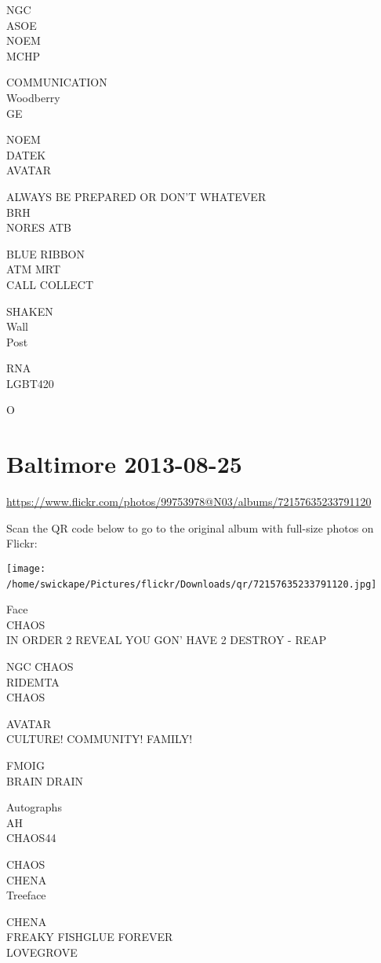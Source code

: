 \documentclass[10pt,letterpaper]{article}
\begin{document}
NGC\\
ASOE\\
NOEM\\
MCHP

COMMUNICATION\\
Woodberry\\
GE

NOEM\\
DATEK\\
AVATAR

ALWAYS BE PREPARED OR DON'T WHATEVER\\
BRH\\
NORES ATB

BLUE RIBBON\\
ATM MRT\\
CALL COLLECT

SHAKEN\\
Wall\\
Post

RNA\\
LGBT420

O
\

\section*{Baltimore 2013-08-25}

\url{https://www.flickr.com/photos/99753978@N03/albums/72157635233791120}

Scan the QR code below to go to the original album with full-size photos on Flickr:

\texttt{[image: /home/swickape/Pictures/flickr/Downloads/qr/72157635233791120.jpg]}
\

Face\\
CHAOS\\
IN ORDER 2 REVEAL YOU GON' HAVE 2 DESTROY {-} REAP

NGC CHAOS\\
RIDEMTA\\
CHAOS

AVATAR\\
CULTURE! COMMUNITY! FAMILY!

FMOIG\\
BRAIN DRAIN

Autographs\\
AH\\
CHAOS44

CHAOS\\
CHENA\\
Treeface

CHENA\\
FREAKY FISHGLUE FOREVER\\
LOVEGROVE
\end{document}
